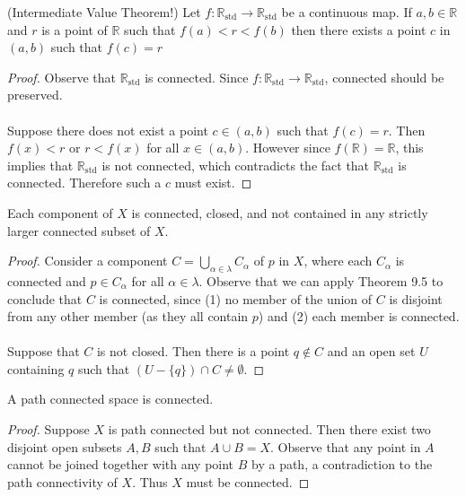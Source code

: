 \documentclass[a4paper,12pt,twoside]{hmcpset}
\begin{document}
\begin{problem}[Theorem 9.13] (Intermediate Value Theorem!)
    Let $f: \mathbb{R}_{\text{std}} \to \mathbb{R}_{\text{std}}$ be a
    continuous map. If $a, b \in \mathbb{R}$ and $r$ is a point of
    $\mathbb{R}$ such that $f(a) < r < f(b)$ then there exists a point
    $c$ in $(a, b)$ such that $f(c) = r$
    
\end{problem}

\begin{proof}
    Observe that $\mathbb{R}_{\text{std}}$ is connected. Since $f:
    \mathbb{R}_{\text{std}} \to \mathbb{R}_{\text{std}}$, connected
    should be preserved.
    \\
    \\
    Suppose there does not exist a point $c \in (a, b)$ such
    that $f(c) = r$. Then $f(x) < r$ or $r < f(x)$ for all $x \in (a,
    b)$. However since $f(\mathbb{R}) = \mathbb{R}$, 
    this implies that $\mathbb{R}_{\text{std}}$ is not
    connected, which contradicts the fact that $\mathbb{R}_\text{std}$
    is connected. Therefore such a $c$ must exist.  
\end{proof}

\begin{problem}[Theorem 9.18]
    Each component of $X$ is connected, closed, and not contained in
    any strictly larger connected subset of $X$.
\end{problem}

\begin{proof}
    Consider a component $C = \bigcup\limits_{\alpha \in \lambda}
    C_\alpha$ of $p$ in $X$, where each $C_\alpha$ is connected and $p \in
    C_\alpha$ for all $\alpha \in \lambda$.
    Observe that we can apply Theorem 9.5 to conclude that $C$ is
    connected, since (1) no member of the union of $C$ is disjoint
    from any other member (as they all contain $p$) and (2) each
    member is connected. 
    \\
    \\
    Suppose that $C$ is not closed. Then there is a point $q \not\in C$
    and an open set $U$ containing $q$ such that $(U - \{q\}) \cap C
    \ne \emptyset$. 


\end{proof}

\begin{problem}[Theorem 9.35]
    A path connected space is connected.
\end{problem}

\begin{proof}
    Suppose $X$ is path connected but not connected. Then there exist
    two disjoint open subsets $A ,B$ such that $A \cup B = X$. Observe
    that any point in $A$ cannot be joined together with any point $B$
    by a path, a contradiction to the path connectivity of $X$. Thus
    $X$ must be connected. 
\end{proof}
\end{document}
